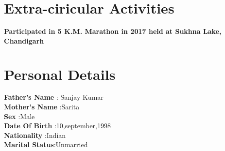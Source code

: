 \documentclass[11pt]{article}
\begin{document}
\section{Extra-ciricular Activities}
\textbf{ Participated in 5 K.M. Marathon in 2017 held at Sukhna Lake, Chandigarh}

\section{Personal Details}
\textbf{Father's Name} : Sanjay Kumar\\
\textbf{Mother's Name} :Sarita \\
\textbf{Sex}           :Male\\
\textbf{Date Of Birth} :10,september,1998\\
\textbf{Nationality}   :Indian\\
\textbf{Marital Status}:Unmarried\\
\end{document}
